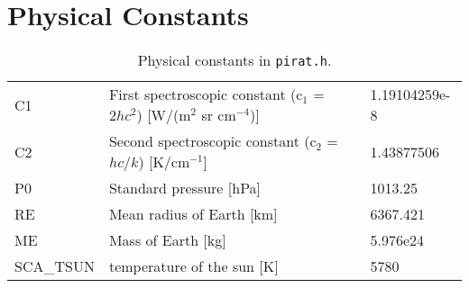 \section{Physical Constants}

\begin{table*}[!h]
\caption{Physical constants in \texttt{pirat.h}.}
\begin{tabular}{|l|l|l|}
\hline
\cellcolor[RGB]{188,188,188}{name} & \cellcolor[RGB]{188,188,188}{purpose} & 
\cellcolor[RGB]{188,188,188}{value} \\
\hline
\hline
C1        & First spectroscopic constant (c$_1$ = $2hc^2$) [W/(m$^2$ sr cm$^{-4}$)] & 1.19104259e-8\\
C2        & Second spectroscopic constant (c$_2$ = $hc$/$k$) [K/cm$^{-1}$]         & 1.43877506 \\
P0        & Standard pressure [hPa]                                         & 1013.25 \\
RE        & Mean radius of Earth [km]                                       & 6367.421 \\
ME        & Mass of Earth [kg]                                              & 5.976e24\\
SCA\_TSUN & temperature of the sun [K]                                      & 5780 \\
\hline
\end{tabular}
\end{table*} 

